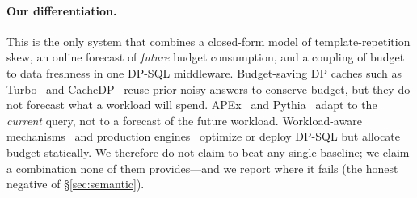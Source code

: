 \documentclass[sigconf,nonacm]{acmart}
\begin{document}
\paragraph{Our differentiation.}
This is the only system that combines a closed-form model of template-repetition skew, an online forecast of \emph{future} budget consumption, and a coupling of budget to data freshness in one DP-SQL middleware. Budget-saving DP caches such as Turbo~\cite{kostopoulou2023turbo} and CacheDP~\cite{mazmudar2023cachedp} reuse prior noisy answers to conserve budget, but they do not forecast what a workload will spend. APEx~\cite{ge2019apex} and Pythia~\cite{kotsogiannis2017pythia} adapt to the \emph{current} query, not to a forecast of the future workload. Workload-aware mechanisms~\cite{li2010mm,mckenna2018hdmm} and production engines~\cite{berghel2022tumult,opendp2023} optimize or deploy DP-SQL but allocate budget statically. We therefore do not claim to beat any single baseline; we claim a combination none of them provides---and we report where it fails (the honest negative of §\ref{sec:semantic}).
\end{document}
